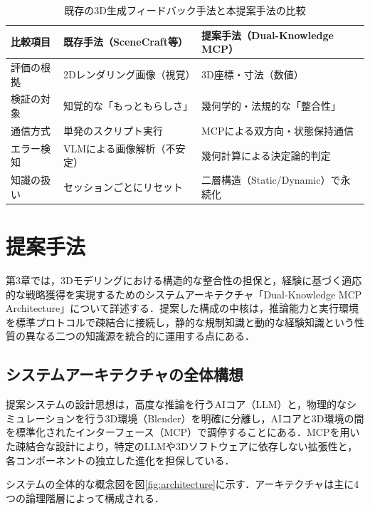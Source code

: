 \documentclass[dvipdfmx, a4paper, 9pt]{deimj}
\begin{document}
\begin{table}[ht]
  \caption{既存の3D生成フィードバック手法と本提案手法の比較}
  \label{tab:comparison}
  \centering
  \small
  \begin{tabularx}{\columnwidth}{lXX}
    \toprule
    比較項目 & 既存手法（SceneCraft等） & 提案手法（Dual-Knowledge MCP）\\
    \midrule
    評価の根拠 & 2Dレンダリング画像（視覚） & 3D座標・寸法（数値）\\
    検証の対象 & 知覚的な「もっともらしさ」 & 幾何学的・法規的な「整合性」\\
    通信方式 & 単発のスクリプト実行 & MCPによる双方向・状態保持通信\\
    エラー検知 & VLMによる画像解析（不安定） & 幾何計算による決定論的判定\\
    知識の扱い & セッションごとにリセット & 二層構造（Static/Dynamic）で永続化\\
    \bottomrule
  \end{tabularx}
\end{table}

\section{提案手法}

第3章では，3Dモデリングにおける構造的な整合性の担保と，経験に基づく適応的な戦略獲得を実現するためのシステムアーキテクチャ「Dual-Knowledge MCP Architecture」について詳述する．提案した構成の中核は，推論能力と実行環境を標準プロトコルで疎結合に接続し，静的な規制知識と動的な経験知識という性質の異なる二つの知識源を統合的に運用する点にある．

\subsection{システムアーキテクチャの全体構想}

提案システムの設計思想は，高度な推論を行うAIコア（LLM）と，物理的なシミュレーションを行う3D環境（Blender\cite{community2018blender}）を明確に分離し，AIコアと3D環境の間を標準化されたインターフェース（MCP）で調停することにある．MCPを用いた疎結合な設計により，特定のLLMや3Dソフトウェアに依存しない拡張性と，各コンポーネントの独立した進化を担保している．

システムの全体的な概念図を図\ref{fig:architecture}に示す．アーキテクチャは主に4つの論理階層によって構成される．
\end{document}
